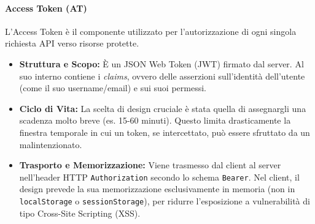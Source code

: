 \documentclass[12pt,a4paper,openright,twoside]{book}
\begin{document}
\paragraph{Access Token (AT)}
L'Access Token è il componente utilizzato per l'autorizzazione di ogni singola richiesta API verso risorse protette.
\begin{itemize}
    \item \textbf{Struttura e Scopo:} È un JSON Web Token (JWT) firmato dal server. Al suo interno contiene i \textit{claims}, ovvero delle asserzioni sull'identità dell'utente (come il suo username/email) e sui suoi permessi.
    \item \textbf{Ciclo di Vita:} La scelta di design cruciale è stata quella di assegnargli una scadenza molto breve (es. 15-60 minuti). Questo limita drasticamente la finestra temporale in cui un token, se intercettato, può essere sfruttato da un malintenzionato.
    \item \textbf{Trasporto e Memorizzazione:} Viene trasmesso dal client al server nell'header HTTP \texttt{Authorization} secondo lo schema \texttt{Bearer}. Nel client, il design prevede la sua memorizzazione esclusivamente in memoria (non in \texttt{localStorage} o \texttt{sessionStorage}), per ridurre l'esposizione a vulnerabilità di tipo Cross-Site Scripting (XSS).
\end{itemize}
\end{document}
